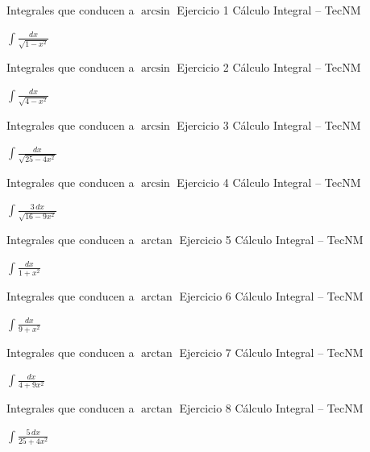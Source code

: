 \documentclass[aspectratio=169,12pt]{beamer}
\newcommand{\ejercicio}[1]{%
  \begin{center}
  \vfill
  {\fontsize{24}{30}\selectfont #1}
  \vfill
  \end{center}
}
\begin{document}
\begin{frame}{Integrales que conducen a $\arcsin$}
\small Ejercicio 1 \hfill Cálculo Integral -- TecNM
\ejercicio{$\displaystyle \int \frac{dx}{\sqrt{1-x^2}}$}
\end{frame}
\begin{frame}{Integrales que conducen a $\arcsin$}
\small Ejercicio 2 \hfill Cálculo Integral -- TecNM
\ejercicio{$\displaystyle \int \frac{dx}{\sqrt{4-x^2}}$}
\end{frame}
\begin{frame}{Integrales que conducen a $\arcsin$}
\small Ejercicio 3 \hfill Cálculo Integral -- TecNM
\ejercicio{$\displaystyle \int \frac{dx}{\sqrt{25-4x^2}}$}
\end{frame}
\begin{frame}{Integrales que conducen a $\arcsin$}
\small Ejercicio 4 \hfill Cálculo Integral -- TecNM
\ejercicio{$\displaystyle \int \frac{3\,dx}{\sqrt{16-9x^2}}$}
\end{frame}
\begin{frame}{Integrales que conducen a $\arctan$}
\small Ejercicio 5 \hfill Cálculo Integral -- TecNM
\ejercicio{$\displaystyle \int \frac{dx}{1+x^2}$}
\end{frame}
\begin{frame}{Integrales que conducen a $\arctan$}
\small Ejercicio 6 \hfill Cálculo Integral -- TecNM
\ejercicio{$\displaystyle \int \frac{dx}{9+x^2}$}
\end{frame}
\begin{frame}{Integrales que conducen a $\arctan$}
\small Ejercicio 7 \hfill Cálculo Integral -- TecNM
\ejercicio{$\displaystyle \int \frac{dx}{4+9x^2}$}
\end{frame}
\begin{frame}{Integrales que conducen a $\arctan$}
\small Ejercicio 8 \hfill Cálculo Integral -- TecNM
\ejercicio{$\displaystyle \int \frac{5\,dx}{25+4x^2}$}
\end{frame}
\end{document}
